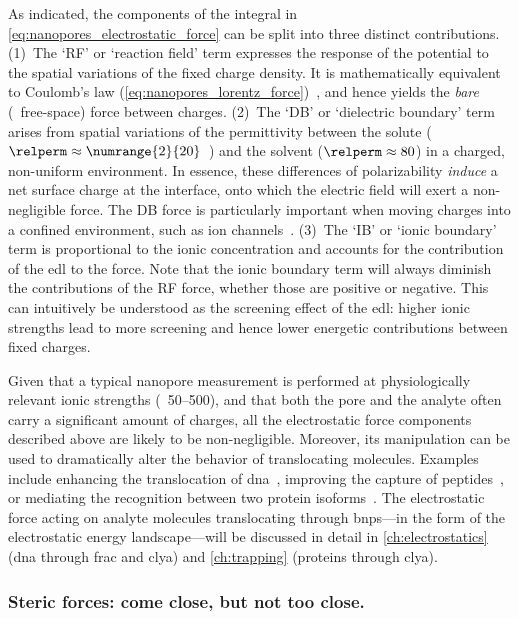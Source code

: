 %
As indicated, the components of the integral in \cref{eq:nanopores_electrostatic_force} can be split into
three distinct contributions. (1)~The `RF' or `reaction field' term expresses the response of the potential to
the spatial variations of the fixed charge density. It is mathematically equivalent to Coulomb's law
(\cref{eq:nanopores_lorentz_force})~\cite{Im-1998}, and hence yields the \emph{bare} (\ie~free-space) force
between charges. (2)~The `DB' or `dielectric boundary' term arises from spatial variations of the permittivity
between the solute ($\relperm \approx \text{\numrange{2}{20}}$~\cite{Li-2013}) and the solvent ($\relperm
\approx 80$) in a charged, non-uniform environment. In essence, these differences of polarizability
\emph{induce} a net surface charge at the interface, onto which the electric field will exert a non-negligible
force. The DB force is particularly important when moving charges into a confined environment, such as ion
channels~\cite{Nadler-2003}. (3)~The `IB' or `ionic boundary' term is proportional to the ionic concentration
and accounts for the contribution of the \gls{edl} to the force. Note that the ionic boundary term will always
diminish the contributions of the RF force, whether those are positive or negative. This can intuitively be
understood as the screening effect of the \gls{edl}: higher ionic strengths lead to more screening and hence
lower energetic contributions between fixed charges.

Given that a typical nanopore measurement is performed at physiologically relevant ionic strengths
(\eg~\SIrange{50}{500}{\mM}), and that both the pore and the analyte often carry a significant amount of
charges, all the electrostatic force components described above are likely to be non-negligible. Moreover, its
manipulation can be used to dramatically alter the behavior of translocating molecules. Examples include
enhancing the translocation of \gls{dna}~\cite{Maglia-2008}, improving the capture of
peptides~\cite{Asandei-2015b,Asandei-2016}, or mediating the recognition between two protein
isoforms~\cite{Fahie-2015b}. The electrostatic force acting on analyte molecules translocating through
\glspl{bnp}---in the form of the electrostatic energy landscape---will be discussed in detail in
\cref{ch:electrostatics} (\gls{dna} through \gls{frac} and \gls{clya}) and \cref{ch:trapping} (proteins
through \gls{clya}).


\subsubsection{Steric forces: come close, but not too close.}
%

